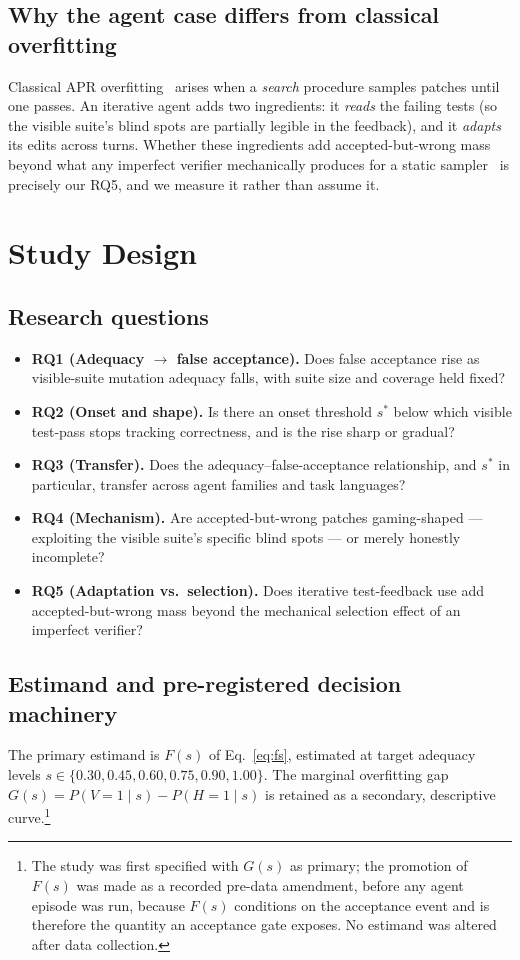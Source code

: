 \documentclass[conference]{IEEEtran}
\newcommand{\Fs}{\ensuremath{F(s)}}
\newcommand{\Gs}{\ensuremath{G(s)}}
\begin{document}
\subsection{Why the agent case differs from classical overfitting}
Classical APR overfitting~\cite{Smith2015Overfitting,Qi2015PatchPlausibility}
arises when a \emph{search} procedure samples patches until one passes.
An iterative agent adds two ingredients: it \emph{reads} the failing
tests (so the visible suite's blind spots are partially legible in the
feedback), and it \emph{adapts} its edits across turns. Whether these
ingredients add accepted-but-wrong mass beyond what any imperfect
verifier mechanically produces for a static
sampler~\cite{ResamplingLimits_j8H84v6AZ1} is precisely our RQ5, and we
measure it rather than assume it.

\section{Study Design}\label{sec:design}

\subsection{Research questions}
\begin{itemize}[leftmargin=1.5em]
\item \textbf{RQ1 (Adequacy $\to$ false acceptance).} Does false
acceptance rise as visible-suite mutation adequacy falls, with suite size
and coverage held fixed?
\item \textbf{RQ2 (Onset and shape).} Is there an onset threshold
$s^\ast$ below which visible test-pass stops tracking correctness, and is
the rise sharp or gradual?
\item \textbf{RQ3 (Transfer).} Does the adequacy--false-acceptance
relationship, and $s^\ast$ in particular, transfer across agent families
and task languages?
\item \textbf{RQ4 (Mechanism).} Are accepted-but-wrong patches
gaming-shaped --- exploiting the visible suite's specific blind spots ---
or merely honestly incomplete?
\item \textbf{RQ5 (Adaptation vs.\ selection).} Does iterative
test-feedback use add accepted-but-wrong mass beyond the mechanical
selection effect of an imperfect verifier?
\end{itemize}

\subsection{Estimand and pre-registered decision machinery}\label{sec:estimand}
The primary estimand is \Fs{} of Eq.~\eqref{eq:fs}, estimated at target
adequacy levels $s \in \{0.30, 0.45, 0.60, 0.75, 0.90, 1.00\}$. The
marginal overfitting gap $\Gs = P(V{=}1 \mid s) - P(H{=}1 \mid s)$ is
retained as a secondary, descriptive curve.\footnote{The study was first
specified with \Gs{} as primary; the promotion of \Fs{} was made as a
recorded pre-data amendment, before any agent episode was run, because
\Fs{} conditions on the acceptance event and is therefore the quantity an
acceptance gate exposes. No estimand was altered after data collection.}
\end{document}
